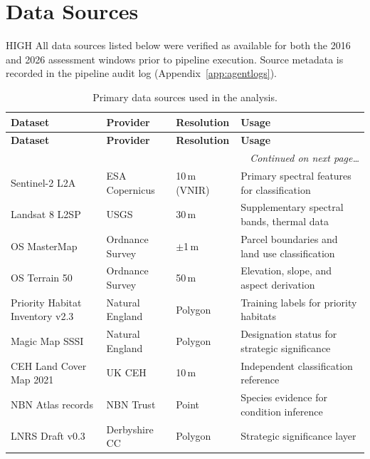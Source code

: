 \section{Data Sources}
\label{sec:datasources}

\begin{confidencebox}{HIGH}
All data sources listed below were verified as available for both the 2016 and 2026 assessment windows prior to pipeline execution. Source metadata is recorded in the pipeline audit log (Appendix~\ref{app:agentlogs}).
\end{confidencebox}

\begin{longtable}{p{35mm}p{30mm}p{25mm}p{45mm}}
\caption{Primary data sources used in the \BDE{} analysis.}
\label{tab:datasources} \\
\toprule
\textbf{Dataset} & \textbf{Provider} & \textbf{Resolution} & \textbf{Usage} \\
\midrule
\endfirsthead
\toprule
\textbf{Dataset} & \textbf{Provider} & \textbf{Resolution} & \textbf{Usage} \\
\midrule
\endhead
\midrule
\multicolumn{4}{r}{\small\itshape Continued on next page\ldots} \\
\bottomrule
\endfoot
\bottomrule
\endlastfoot

Sentinel-2 L2A   & ESA Copernicus     & 10\,m (VNIR)       & Primary spectral features for classification \\
Landsat 8 L2SP   & USGS               & 30\,m              & Supplementary spectral bands, thermal data \\
OS MasterMap      & Ordnance Survey    & $\pm$1\,m          & Parcel boundaries and land use classification \\
OS Terrain 50     & Ordnance Survey    & 50\,m              & Elevation, slope, and aspect derivation \\
Priority Habitat Inventory v2.3 & Natural England & Polygon & Training labels for priority habitats \\
Magic Map SSSI    & Natural England    & Polygon             & Designation status for strategic significance \\
CEH Land Cover Map 2021 & UK CEH      & 10\,m              & Independent classification reference \\
NBN Atlas records & NBN Trust          & Point               & Species evidence for condition inference \\
LNRS Draft v0.3  & Derbyshire CC      & Polygon             & Strategic significance layer \\
\end{longtable}


